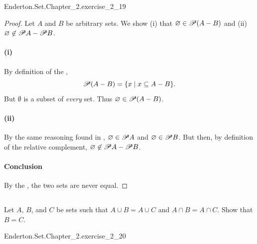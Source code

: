 \documentclass{report}
\begin{document}
    {Enderton.Set.Chapter\_2.exercise\_2\_19}

  \begin{proof}
    Let $A$ and $B$ be arbitrary sets.
    We show (i) that $\varnothing \in \mathscr{P}(A - B)$ and (ii)
      $\varnothing \not\in \mathscr{P}A - \mathscr{P}B$.

    \paragraph{(i)}%

      By definition of the ,
        $$\mathscr{P}(A - B) = \{ x \mid x \subseteq A - B \}.$$
      But $\emptyset$ is a subset of \textit{every} set.
      Thus $\varnothing \in \mathscr{P}(A - B)$.

    \paragraph{(ii)}%

      By the same reasoning found in ,
        $\varnothing \in \mathscr{P}A$ and $\varnothing \in \mathscr{P}B$.
      But then, by definition of the relative complement,
        $\varnothing \not\in \mathscr{P}A - \mathscr{P}B$.

    \paragraph{Conclusion}%

      By the , the two sets are never equal.

  \end{proof}

\subsection{}%

  Let $A$, $B$, and $C$ be sets such that $A \cup B = A \cup C$ and
    $A \cap B = A \cap C$.
  Show that $B = C$.

    {Enderton.Set.Chapter\_2.exercise\_2\_20}
\end{document}
